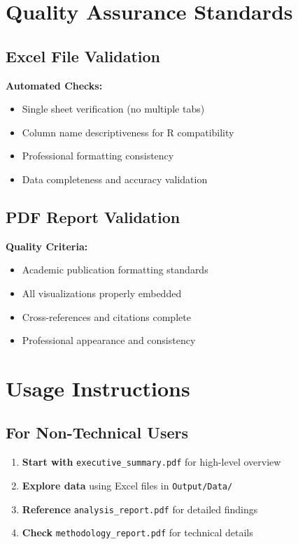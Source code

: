 \documentclass[11pt,letterpaper]{article}
\begin{document}
\section{Quality Assurance Standards}

\subsection{Excel File Validation}
\textbf{Automated Checks:}
\begin{itemize}
    \item Single sheet verification (no multiple tabs)
    \item Column name descriptiveness for R compatibility
    \item Professional formatting consistency
    \item Data completeness and accuracy validation
\end{itemize}

\subsection{PDF Report Validation}
\textbf{Quality Criteria:}
\begin{itemize}
    \item Academic publication formatting standards
    \item All visualizations properly embedded
    \item Cross-references and citations complete
    \item Professional appearance and consistency
\end{itemize}

\section{Usage Instructions}

\subsection{For Non-Technical Users}
\begin{enumerate}
    \item \textbf{Start with} \texttt{executive\_summary.pdf} for high-level overview
    \item \textbf{Explore data} using Excel files in \texttt{Output/Data/}
    \item \textbf{Reference} \texttt{analysis\_report.pdf} for detailed findings
    \item \textbf{Check} \texttt{methodology\_report.pdf} for technical details
\end{enumerate}
\end{document}
